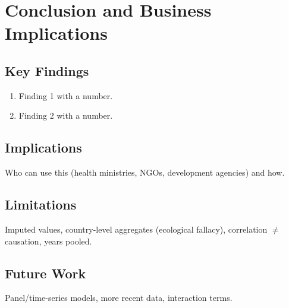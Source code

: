 \documentclass[12pt,a4paper]{article}
\begin{document}
\section{Conclusion and Business Implications}
\subsection{Key Findings}
\begin{enumerate}
\item Finding 1 with a number.
\item Finding 2 with a number.
\end{enumerate}
\subsection{Implications}
Who can use this (health ministries, NGOs, development agencies) and how.
\subsection{Limitations}
Imputed values, country-level aggregates (ecological fallacy), correlation $\neq$ causation, years pooled.
\subsection{Future Work}
Panel/time-series models, more recent data, interaction terms.

\end{document}
